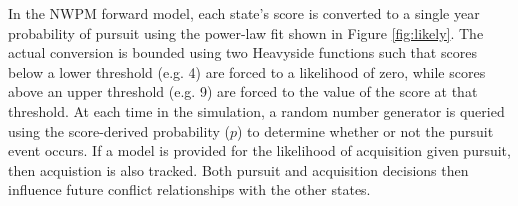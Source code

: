 In the \gls{NWPM} forward model, each state's score is converted to a single year probability of pursuit using the power-law fit shown in Figure \ref{fig:likely}. The actual conversion is bounded using two Heavyside functions such that scores below a lower threshold (e.g. 4) are forced to a likelihood of zero, while scores above an upper threshold (e.g. 9) are forced to the value of the score at that threshold. At each time in the simulation, a random number generator is queried using the score-derived probability ($p$) to determine whether or not the pursuit event occurs. If a model is provided for the likelihood of acquisition given pursuit, then acquistion is also tracked. Both pursuit and acquisition decisions then influence future conflict relationships with the other states.


